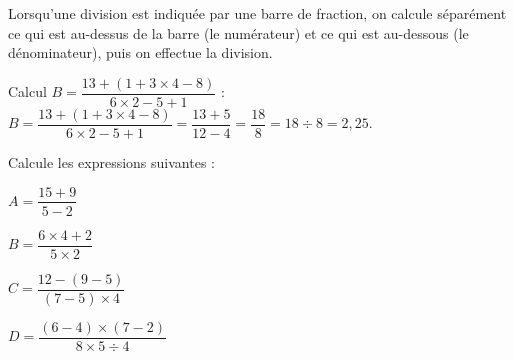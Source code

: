 \begin{aconnaitre}
Lorsqu’une division est indiquée par une barre de fraction, on calcule séparément ce qui est au-dessus de la barre (le numérateur) et ce qui est au-dessous (le dénominateur), puis on effectue la division.
\end{aconnaitre}



\begin{methode*1}

\begin{exemple*1}
Calcul $B = \dfrac{13 + (1+ 3 \times 4 - 8)}{6 \times 2 - 5 + 1}$ : \\[1em]
$B = \dfrac{13 + (1+ 3 \times 4 - 8)}{6 \times 2 - 5 + 1} = \dfrac{13 + 5}{12 - 4} = \dfrac{18}{8} = 18 \div 8 = 2,25$.
\end{exemple*1}


 \exercice 
Calcule les expressions suivantes :
\begin{colenumerate}{2}
\item $A=\dfrac{15 +9}{5 - 2}$\dotfill

\hfill

\dotfill

\item $B=\dfrac{6 \times 4 + 2}{5 \times 2}$\dotfill

\hfill

\dotfill

\item $C=\dfrac{12 - (9 - 5)}{(7- 5) \times 4}$\dotfill

\hfill

\dotfill

\item $D=\dfrac{(6 - 4) \times (7 - 2)}{8 \times 5 \div 4}$ \dotfill

\hfill

\dotfill

\hfill

\dotfill

 \end{colenumerate}

\end{methode*1}

